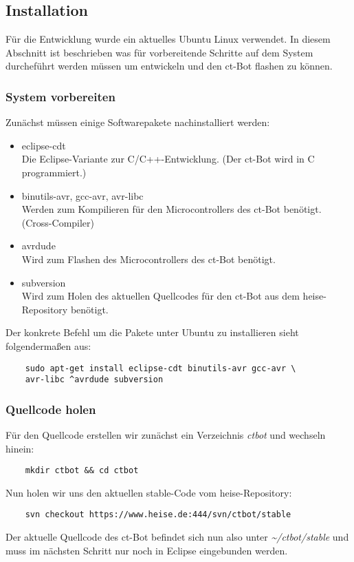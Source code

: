 \subsection{Installation}
Für die Entwicklung wurde ein aktuelles Ubuntu Linux verwendet. In diesem Abschnitt ist beschrieben was für vorbereitende Schritte auf dem System durcheführt werden müssen um entwickeln und den ct-Bot flashen zu können.


\subsubsection{System vorbereiten}
Zunächst müssen einige Softwarepakete nachinstalliert werden:
\begin{itemize}
\item eclipse-cdt\\
Die Eclipse-Variante zur C/C++-Entwicklung. (Der ct-Bot wird in C programmiert.)
\item binutils-avr, gcc-avr, avr-libc\\
Werden zum Kompilieren für den Microcontrollers des ct-Bot benötigt. (Cross-Compiler)
\item avrdude\\
Wird zum Flashen des Microcontrollers des ct-Bot benötigt.
\item subversion\\
Wird zum Holen des aktuellen Quellcodes für den ct-Bot aus dem heise-Repository benötigt.
\end{itemize}
Der konkrete Befehl um die Pakete unter Ubuntu zu installieren sieht folgendermaßen aus:
\begin{lstlisting}
	sudo apt-get install eclipse-cdt binutils-avr gcc-avr \
	avr-libc ^avrdude subversion
\end{lstlisting}


\subsubsection{Quellcode holen}
Für den Quellcode erstellen wir zunächst ein Verzeichnis \textit{ctbot} und wechseln hinein:
\begin{lstlisting}
	mkdir ctbot && cd ctbot
\end{lstlisting}
Nun holen wir uns den aktuellen stable-Code vom heise-Repository:
\begin{lstlisting}
	svn checkout https://www.heise.de:444/svn/ctbot/stable
\end{lstlisting}
Der aktuelle Quellcode des ct-Bot befindet sich nun also unter \textit{\~{}/ctbot/stable} und muss im nächsten Schritt nur noch in Eclipse eingebunden werden.



